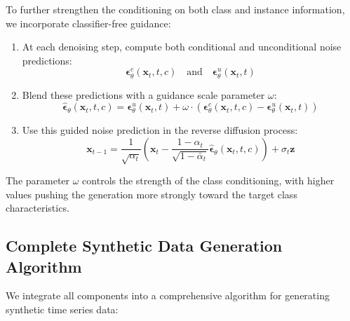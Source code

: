 \documentclass{article}
\begin{document}
To further strengthen the conditioning on both class and instance information, we incorporate classifier-free guidance:

\begin{enumerate}
    \item At each denoising step, compute both conditional and unconditional noise predictions:
    \begin{equation}
    \boldsymbol{\epsilon}_\theta^c(\mathbf{x}_t, t, c) \quad \text{and} \quad \boldsymbol{\epsilon}_\theta^u(\mathbf{x}_t, t)
    \end{equation}

    \item Blend these predictions with a guidance scale parameter $\omega$:
    \begin{equation}
    \hat{\boldsymbol{\epsilon}}_\theta(\mathbf{x}_t, t, c) = \boldsymbol{\epsilon}_\theta^u(\mathbf{x}_t, t) + \omega \cdot (\boldsymbol{\epsilon}_\theta^c(\mathbf{x}_t, t, c) - \boldsymbol{\epsilon}_\theta^u(\mathbf{x}_t, t))
    \end{equation}

    \item Use this guided noise prediction in the reverse diffusion process:
    \begin{equation}
    \mathbf{x}_{t-1} = \frac{1}{\sqrt{\alpha_t}} \left( \mathbf{x}_t - \frac{1-\alpha_t}{\sqrt{1-\bar{\alpha}_t}} \hat{\boldsymbol{\epsilon}}_\theta(\mathbf{x}_t, t, c) \right) + \sigma_t \mathbf{z}
    \end{equation}
\end{enumerate}

The parameter $\omega$ controls the strength of the class conditioning, with higher values pushing the generation more strongly toward the target class characteristics.

\subsection{Complete Synthetic Data Generation Algorithm}

We integrate all components into a comprehensive algorithm for generating synthetic time series data:
\end{document}
